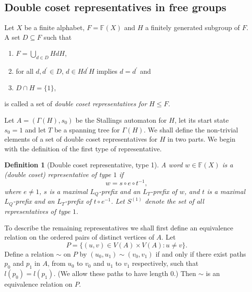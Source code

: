 \documentclass[a4paper,12pt]{article}
\newcommand{\G}{\Gamma }
\newtheorem{definition}[theorem]{Definition}
\numberwithin{equation}{section}
\numberwithin{figure}{section}
\newcommand{\FF}{\ensuremath{\mathbb{F}}}
\newcommand{\be}{\begin{enumerate}}
\newcommand{\ee}{\end{enumerate}}
\begin{document}
\subsection{Double coset representatives in free groups}\label{sub:2cosetrepr}
Let $X$ be a finite alphabet, $F=\FF(X)$ and $H$ a finitely generated subgroup
of $F$.
A  set $D\subseteq F$ such that
\be
\item
$F = \displaystyle{\bigcup_{d \in D} HdH}$, 
\item
for all $d, d^\prime \in D$, $d\in H d^\prime H$
implies $d=d^\prime$ and 
\item $D\cap H=\{1\}$, 
\ee
is called a set of \emph{double coset representatives for} $H\le F$.


Let $A=(\G(H),s_0)$ be the Stallings automaton for $H$, let its start state 
$s_0=1$  and let  $T$ be
a spanning tree for $\G(H)$.
We shall define the non-trivial elements of  a set of double coset representatives for $H$ in two parts.
We begin with the definition of the first  type of representative.
\begin{definition}[Double coset representative, type 1] \label{def:repres_t1}
A word $w\in \FF(X)$ is a {\em (double coset) representative of
type} $1$ if
\[w=s\circ e \circ t^{-1},\]
where $e\neq 1$, $s$ is a maximal $L_Q$-prefix and an $L_T$-prefix of $w$,
and $t$ is a maximal $L_Q$-prefix and an
$L_T$-prefix of $t\circ e^{-1}$. Let $S^{(1)}$ denote the set of all representatives of type $1$.
\end{definition}


To describe the remaining representatives we shall first define an equivalence
relation on the ordered pairs of distinct vertices of $A$. Let
\[P=\{(u,v)\in V(A)\times V(A): u\neq v\}.\]
Define a relation $\sim$ on $P$ by $(u_0,u_1)\sim (v_0,v_1)$ if and only if
there exist paths $p_0$ and $p_1$ in $A$, from $u_0$ to $v_0$ and $u_1$ to $v_1$
respectively, such that $l(p_0)=l(p_1)$. (We allow these paths to have length $0$.)
Then $\sim$ is an equivalence relation on $P$.
\end{document}
